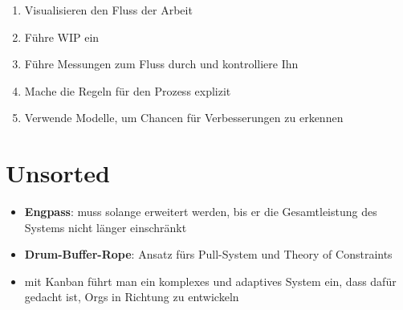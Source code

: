 
\begin{enumerate}
  \item Visualisieren den Fluss der Arbeit
  \item Führe WIP ein
  \item Führe Messungen zum Fluss durch und kontrolliere Ihn
  \item Mache die Regeln für den Prozess explizit
  \item Verwende Modelle, um Chancen für Verbesserungen zu erkennen
\end{enumerate}

\section{Unsorted}
\begin{itemize}
  \item \textbf{Engpass}: muss solange erweitert werden, bis er die Gesamtleistung des Systems nicht
    länger einschränkt
  \item \textbf{Drum-Buffer-Rope}: Ansatz fürs Pull-System und Theory of Constraints
  \item mit Kanban führt man ein komplexes und adaptives System ein, dass dafür gedacht ist, Orgs in
    Richtung  zu entwickeln
\end{itemize}



